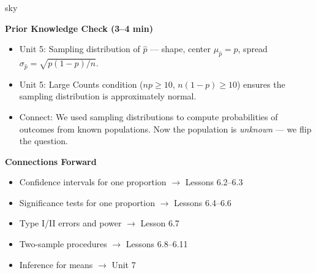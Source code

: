 \documentclass[10pt]{article}
\begin{document}
\begin{skillbox}{sky}
\begin{minipage}[t]{0.48\linewidth}
    \textbf{Prior Knowledge Check (3--4 min)}
    \begin{itemize}
        \item Unit 5: Sampling distribution of $\hat p$ --- shape, center $\mu_{\hat p} = p$,
              spread $\sigma_{\hat p} = \sqrt{p(1-p)/n}$.
        \item Unit 5: Large Counts condition ($np \ge 10$, $n(1-p) \ge 10$) ensures
              the sampling distribution is approximately normal.
        \item Connect: We used sampling distributions to compute probabilities of outcomes
              from known populations. Now the population is \emph{unknown} --- we flip the question.
    \end{itemize}
\end{minipage}
\hfill
\begin{minipage}[t]{0.48\linewidth}
    \textbf{Connections Forward}
    \begin{itemize}
        \item Confidence intervals for one proportion $\to$ Lessons 6.2--6.3
        \item Significance tests for one proportion $\to$ Lessons 6.4--6.6
        \item Type I/II errors and power $\to$ Lesson 6.7
        \item Two-sample procedures $\to$ Lessons 6.8--6.11
        \item Inference for means $\to$ Unit 7
    \end{itemize}
\end{minipage}
\end{skillbox}
\end{document}
